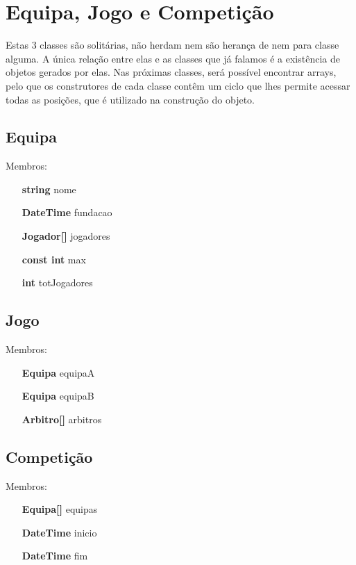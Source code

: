 \section{Equipa, Jogo e Competição}
Estas 3 classes são solitárias, não herdam nem são herança de nem para classe alguma.
A única relação entre elas e as classes que já falamos é a existência de objetos gerados por elas.
 Nas próximas classes, será possível encontrar arrays, pelo que os construtores de cada classe contêm um ciclo que lhes permite acessar todas as posições, que é utilizado na construção do objeto.
\linebreak
\subsection{Equipa}
Membros: 
\begin{itemize}
	\item[\textbf{string}] nome
	\item[\textbf{DateTime}] fundacao
	\item[\textbf{Jogador[]}] jogadores
	\item[\textbf{const int}] max
	\item[\textbf{int}] totJogadores
\end{itemize}

\subsection{Jogo}
Membros: 
\begin{itemize}
	\item[\textbf{Equipa}] equipaA
	\item[\textbf{Equipa}] equipaB
	\item[\textbf{Arbitro[]}] arbitros
\end{itemize}

\subsection{Competição}

Membros: 
\begin{itemize}
	\item[\textbf{Equipa[]}] equipas
	\item[\textbf{DateTime}] inicio
	\item[\textbf{DateTime}] fim
\end{itemize}